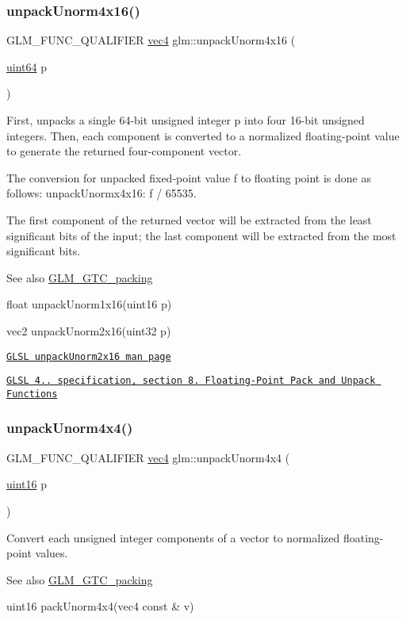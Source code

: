 \subsubsection{\texorpdfstring{unpack\+Unorm4x16()}{unpackUnorm4x16()}}
{\footnotesize\ttfamily G\+L\+M\+\_\+\+F\+U\+N\+C\+\_\+\+Q\+U\+A\+L\+I\+F\+I\+ER \hyperlink{group__core__types_ga5881b1b022d7fd1b7218f5916532dd02}{vec4} glm\+::unpack\+Unorm4x16 (\begin{DoxyParamCaption}\item[{\hyperlink{group__gtc__type__precision_gae3632bf9b37da66233d78930dd06378a}{uint64}}]{p }\end{DoxyParamCaption})}

First, unpacks a single 64-\/bit unsigned integer p into four 16-\/bit unsigned integers. Then, each component is converted to a normalized floating-\/point value to generate the returned four-\/component vector.

The conversion for unpacked fixed-\/point value f to floating point is done as follows\+: unpack\+Unormx4x16\+: f / 65535.

The first component of the returned vector will be extracted from the least significant bits of the input; the last component will be extracted from the most significant bits.

\begin{DoxySeeAlso}{See also}
\hyperlink{group__gtc__packing}{G\+L\+M\+\_\+\+G\+T\+C\+\_\+packing} 

float unpack\+Unorm1x16(uint16 p) 

vec2 unpack\+Unorm2x16(uint32 p) 

\href{http://www.opengl.org/sdk/docs/manglsl/xhtml/unpackUnorm2x16.xml}{\tt G\+L\+SL unpack\+Unorm2x16 man page} 

\href{http://www.opengl.org/registry/doc/GLSLangSpec.4.20.8.pdf}{\tt G\+L\+SL 4.. specification, section 8. Floating-\/\+Point Pack and Unpack Functions} 
\end{DoxySeeAlso}
\mbox{\label{group__gtc__packing_ga38a0a518d53e15a9481c31dc1e574a40}} 
\subsubsection{\texorpdfstring{unpack\+Unorm4x4()}{unpackUnorm4x4()}}
{\footnotesize\ttfamily G\+L\+M\+\_\+\+F\+U\+N\+C\+\_\+\+Q\+U\+A\+L\+I\+F\+I\+ER \hyperlink{group__core__types_ga5881b1b022d7fd1b7218f5916532dd02}{vec4} glm\+::unpack\+Unorm4x4 (\begin{DoxyParamCaption}\item[{\hyperlink{group__gtc__type__precision_gad8c2939e1fdd8e5828b31d95c52255d5}{uint16}}]{p }\end{DoxyParamCaption})}

Convert each unsigned integer components of a vector to normalized floating-\/point values.

\begin{DoxySeeAlso}{See also}
\hyperlink{group__gtc__packing}{G\+L\+M\+\_\+\+G\+T\+C\+\_\+packing} 

uint16 pack\+Unorm4x4(vec4 const \& v) 
\end{DoxySeeAlso}
